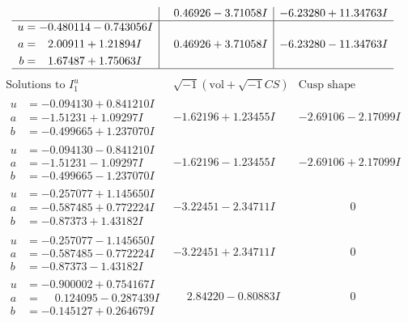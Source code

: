 \documentclass[1p]{elsarticle_modified}
\theoremstyle{definition}
\newcommand{\I}{\sqrt{-1}}
\begin{document}
$$\begin{array}{c|c|c}
 & \phantom{-}0.46926 - 3.71058 I & -6.23280 + 11.34763 I \\ \hline\begin{aligned}
u &= -0.480114 - 0.743056 I \\
a &= \phantom{-}2.00911 + 1.21894 I \\
b &= \phantom{-}1.67487 + 1.75063 I\end{aligned}
 & \phantom{-}0.46926 + 3.71058 I & -6.23280 - 11.34763 I\\
 \hline 
 \end{array}$$\newpage$$\begin{array}{c|c|c}  
\text{Solutions to }I^u_{1}& \I (\text{vol} + \sqrt{-1}CS) & \text{Cusp shape}\\
 \hline 
\begin{aligned}
u &= -0.094130 + 0.841210 I \\
a &= -1.51231 + 1.09297 I \\
b &= -0.499665 + 1.237070 I\end{aligned}
 & -1.62196 + 1.23455 I & -2.69106 - 2.17099 I \\ \hline\begin{aligned}
u &= -0.094130 - 0.841210 I \\
a &= -1.51231 - 1.09297 I \\
b &= -0.499665 - 1.237070 I\end{aligned}
 & -1.62196 - 1.23455 I & -2.69106 + 2.17099 I \\ \hline\begin{aligned}
u &= -0.257077 + 1.145650 I \\
a &= -0.587485 + 0.772224 I \\
b &= -0.87373 + 1.43182 I\end{aligned}
 & -3.22451 - 2.34711 I & \phantom{-0.000000 } 0 \\ \hline\begin{aligned}
u &= -0.257077 - 1.145650 I \\
a &= -0.587485 - 0.772224 I \\
b &= -0.87373 - 1.43182 I\end{aligned}
 & -3.22451 + 2.34711 I & \phantom{-0.000000 } 0 \\ \hline\begin{aligned}
u &= -0.900002 + 0.754167 I \\
a &= \phantom{-}0.124095 - 0.287439 I \\
b &= -0.145127 + 0.264679 I\end{aligned}
 & \phantom{-}2.84220 - 0.80883 I & \phantom{-0.000000 } 0 \\ \hline\begin{aligned}

\end{aligned}
\end{array}$$
\end{document}
